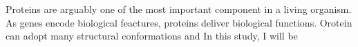 Proteins are arguably one of the most important component in a living organism. As genes encode biological feactures, proteins deliver biological functions. Orotein can adopt many structural conformations and   In this study, I will be 